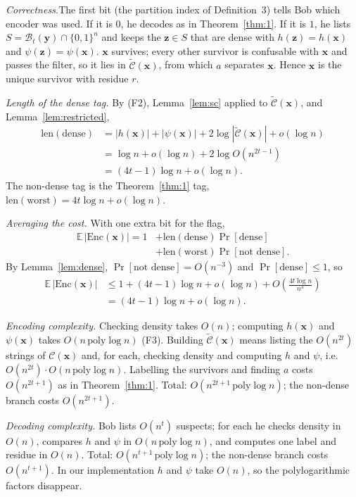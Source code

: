 \documentclass[journal,10pt]{IEEEtran}
\newcommand{\step}[1]{\par\smallskip\noindent\emph{#1}\enspace}
\newcommand{\Enc}{\mathrm{Enc}}
\newcommand{\B}{\mathcal{B}}
\newcommand{\C}{\mathcal{C}}
\newcommand{\Ct}{\widetilde{\mathcal{C}}}
\newcommand{\bx}{\mathbf{x}}
\newcommand{\by}{\mathbf{y}}
\newcommand{\bz}{\mathbf{z}}
\begin{document}
\begin{IEEEproof}
\emph{Correctness.}\enspace The first bit (the partition index of Definition~3) tells Bob which encoder was used. If it is $0$, he decodes as in Theorem~\ref{thm:1}. If it is $1$, he lists $S=\B_t(\by)\cap\{0,1\}^n$ and keeps the $\bz\in S$ that are dense with $h(\bz)=h(\bx)$ and $\psi(\bz)=\psi(\bx)$. $\bx$ survives; every other survivor is confusable with $\bx$ and passes the filter, so it lies in $\Ct(\bx)$, from which $a$ separates $\bx$. Hence $\bx$ is the unique survivor with residue $r$.

\step{Length of the dense tag.} By (F2), Lemma~\ref{lem:sc} applied to $\Ct(\bx)$, and Lemma~\ref{lem:restricted},
\begin{align*}
\mathrm{len}(\text{dense})&=|h(\bx)|+|\psi(\bx)|+2\log|\Ct(\bx)|+o(\log n)\\
&=\log n+o(\log n)+2\log O(n^{2t-1})\\
&=(4t-1)\log n+o(\log n).
\end{align*}
The non-dense tag is the Theorem~\ref{thm:1} tag, $\mathrm{len}(\text{worst})=4t\log n+o(\log n)$.

\step{Averaging the cost.} With one extra bit for the flag,
\begin{align*}
\mathbb E\,|\Enc(\bx)|=1&+\mathrm{len}(\text{dense})\Pr[\text{dense}]\\
&+\mathrm{len}(\text{worst})\Pr[\text{not dense}].
\end{align*}
By Lemma~\ref{lem:dense}, $\Pr[\text{not dense}]=O(n^{-3})$ and $\Pr[\text{dense}]\le1$, so
\begin{align*}
\mathbb E\,|\Enc(\bx)|&\le1+(4t-1)\log n+o(\log n)+O\!\left(\frac{4t\log n}{n^3}\right)\\
&=(4t-1)\log n+o(\log n).
\end{align*}

\step{Encoding complexity.} Checking density takes $O(n)$; computing $h(\bx)$ and $\psi(\bx)$ takes $O(n\,\mathrm{poly}\log n)$ (F3). Building $\Ct(\bx)$ means listing the $O(n^{2t})$ strings of $\C(\bx)$ and, for each, checking density and computing $h$ and $\psi$, i.e.\ $O(n^{2t})\cdot O(n\,\mathrm{poly}\log n)$. Labelling the survivors and finding $a$ costs $O(n^{2t+1})$ as in Theorem~\ref{thm:1}. Total: $O(n^{2t+1}\,\mathrm{poly}\log n)$; the non-dense branch costs $O(n^{2t+1})$.

\step{Decoding complexity.} Bob lists $O(n^t)$ suspects; for each he checks density in $O(n)$, compares $h$ and $\psi$ in $O(n\,\mathrm{poly}\log n)$, and computes one label and residue in $O(n)$. Total: $O(n^{t+1}\,\mathrm{poly}\log n)$; the non-dense branch costs $O(n^{t+1})$. In our implementation $h$ and $\psi$ take $O(n)$, so the polylogarithmic factors disappear.
\end{IEEEproof}
\end{document}
